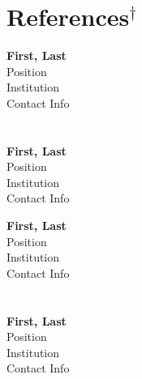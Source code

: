 \section{\textbf{References}$^\dagger$}

\begin{minipage}[t]{0.5\textwidth} 
\textbf{First, Last}\\
Position\\
Institution\\
Contact Info\\
\\
\\
\textbf{First, Last}\\
Position\\
Institution\\
Contact Info
\end{minipage}\begin{minipage}[t]{0.5\textwidth}
\textbf{First, Last}\\
Position\\
Institution\\
Contact Info\\
\\
\\
\textbf{First, Last}\\
Position\\
Institution\\
Contact Info
\end{minipage}

